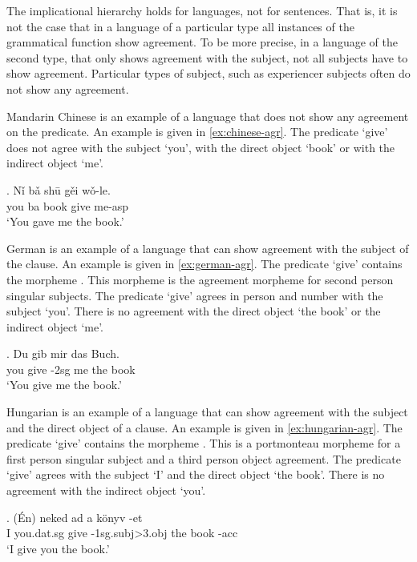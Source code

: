 The implicational hierarchy holds for languages, not for sentences. That is, it is not the case that in a language of a particular type all instances of the grammatical function show agreement. To be more precise, in a language of the second type, that only shows agreement with the subject, not all subjects have to show agreement. Particular types of subject, such as experiencer subjects often do not show any agreement.

Mandarin Chinese is an example of a language that does not show any agreement on the predicate. An example is given in \ref{ex:chinese-agr}. The predicate  `give' does not agree with the subject  `you', with the direct object  `book' or with the indirect object  `me'.

\exg. Nǐ bǎ shū gěi wǒ-le.\\
 you ba book give me-\ac{asp}\\
 `You gave me the book.' \label{ex:chinese-agr}

German is an example of a language that can show agreement with the subject of the clause. An example is given in \ref{ex:german-agr}. The predicate  `give' contains the morpheme . This morpheme is the agreement morpheme for second person singular subjects. The predicate  `give' agrees in person and number with the subject  `you'. There is no agreement with the direct object  `the book' or the indirect object  `me'.

\exg. Du gib  mir das Buch.\\
 you give -2\ac{sg} me the book\\
 `You give me the book.' \label{ex:german-agr}

Hungarian is an example of a language that can show agreement with the subject and the direct object of a clause. An example is given in \ref{ex:hungarian-agr}. The predicate  `give' contains the morpheme . This is a portmonteau morpheme for a first person singular subject and a third person object agreement. The predicate  `give' agrees with the subject  `I' and the direct object  `the book'. There is no agreement with the indirect object  `you'.

\exg. (Én) neked ad  a könyv -et\\
 I you.\ac{dat}.\ac{sg} give -1\ac{sg}.\ac{subj}>3.\ac{obj} the book -\ac{acc}\\
 `I give you the book.' \label{ex:hungarian-agr}

